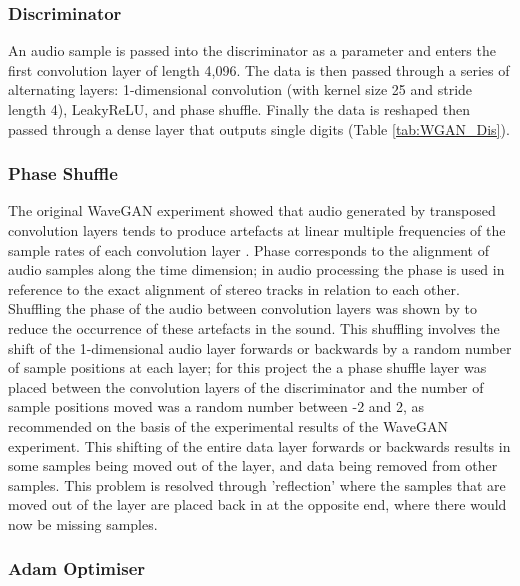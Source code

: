 \documentclass[a4paper, titlepage]{article}
\begin{document}
\subsubsection{Discriminator}

An audio sample is passed into the discriminator as a parameter and enters the first convolution layer of length 4,096.
The data is then passed through a series of alternating layers: 1-dimensional convolution (with kernel size 25 and stride length 4), LeakyReLU, and phase shuffle.
Finally the data is reshaped then passed through a dense layer that outputs single digits (Table \ref{tab:WGAN_Dis}).

\subsubsection{Phase Shuffle}

The original WaveGAN experiment showed that audio generated by transposed convolution layers tends to produce artefacts at linear multiple frequencies of the sample rates of each convolution layer \citep{2018arXiv180204208D}.
Phase corresponds to the alignment of audio samples along the time dimension; in audio processing the phase is used in reference to the exact alignment of stereo tracks in relation to each other.
\newline
\newline
Shuffling the phase of the audio between convolution layers was shown by \citeauthor{2018arXiv180204208D} to reduce the occurrence of these artefacts in the sound.
This shuffling involves the shift of the 1-dimensional audio layer forwards or backwards by a random number of sample positions at each layer; for this project the a phase shuffle layer was placed between the convolution layers of the discriminator and the number of sample positions moved was a random number between -2 and 2, as recommended on the basis of the experimental results of the WaveGAN experiment.
\newline
\newline
This shifting of the entire data layer forwards or backwards results in some samples being moved out of the layer, and data being removed from other samples. This problem is resolved through 'reflection' where the samples that are moved out of the layer are placed back in at the opposite end, where there would now be missing samples.

\subsubsection{Adam Optimiser}
\end{document}
